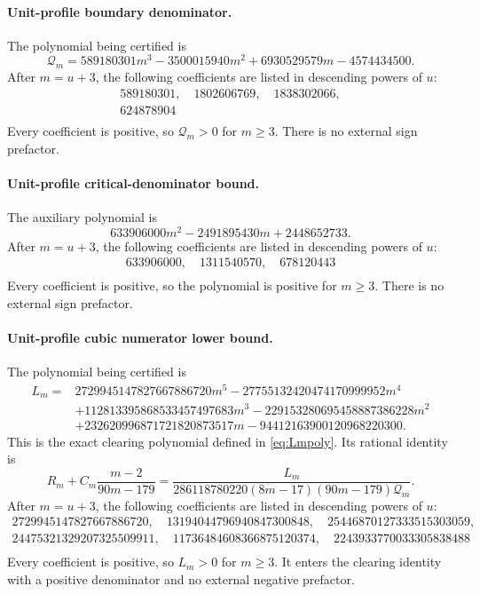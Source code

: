 \paragraph{Unit-profile boundary denominator.} The polynomial being certified is
\[
 \mathcal Q_m=589180301m^3-3500015940m^2
 +6930529579m-4574434500.
\]
After $m=u+3$, the following coefficients are listed in descending powers
of $u$:
\[
\begin{gathered}
589180301,\quad 1802606769,\quad 1838302066,\\
624878904\\
\end{gathered}
\]\noindent Every coefficient is positive, so $\mathcal Q_m>0$ for
$m\ge3$.  There is no external sign prefactor.

\paragraph{Unit-profile critical-denominator bound.} The auxiliary polynomial is
\[
 633906000m^2-2491895430m+2448652733.
\]
After $m=u+3$, the following coefficients are listed in descending powers
of $u$:
\[
\begin{gathered}
633906000,\quad 1311540570,\quad 678120443\\
\end{gathered}
\]\noindent Every coefficient is positive, so the polynomial is positive
for $m\ge3$.  There is no external sign prefactor.

\paragraph{Unit-profile cubic numerator lower bound.} The polynomial being certified is
\[
\begin{split}
 L_m={}&2729945147827667886720m^5
 -27755132420474170999952m^4\\
 &+112813395868533457497683m^3
 -229153280695458887386228m^2\\
 &+232620996871721820873517m
 -94412163900120968220300.
\end{split}
\]
This is the exact clearing polynomial defined in \eqref{eq:Lmpoly}.
Its rational identity is
\[
 R_m+C_m\frac{m-2}{90m-179}
 =\frac{L_m}{286118780220(8m-17)(90m-179)\mathcal Q_m}.
\]
After $m=u+3$, the following coefficients are listed in descending powers
of $u$:
\[
\begin{gathered}
2729945147827667886720,\quad 13194044796940847300848,\quad 25446870127333515303059,\\
24475321329207325509911,\quad 11736484608366875120374,\quad 2243933770033305838488\\
\end{gathered}
\]\noindent Every coefficient is positive, so $L_m>0$ for $m\ge3$.
It enters the clearing identity with a positive denominator and no external
negative prefactor.

